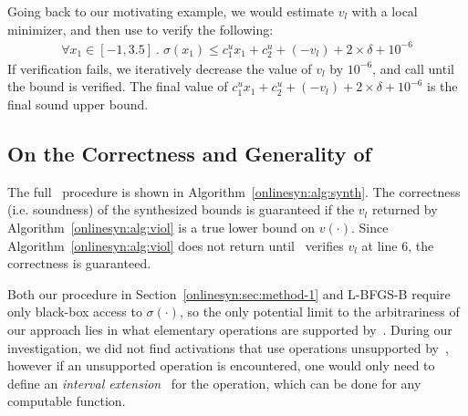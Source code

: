 Going back to our motivating example, we would estimate $ v_l $ with a local
minimizer, and then use \dReal{} to verify the following:
\begin{gather*}
\forall x_1 \in [-1, 3.5] ~. \; \sigma(x_1) \leq c_1^ux_1 + c_2^u + (-v_l) + 2
\times \delta + 10^{-6}
\end{gather*}
If verification fails, we iteratively decrease the value of $ v_l $ by $
10^{-6} $, and call \dReal{} until the bound is verified. The final
value of $ c_1^ux_1 + c_2^u + (-v_l) + 2 \times \delta + 10^{-6} $ is the final
sound upper bound.

\subsection{On the Correctness and Generality of~\Name{}}
The full~\Name{} procedure is shown in Algorithm~\ref{onlinesyn:alg:synth}. The
correctness (i.e. soundness) of the synthesized bounds is guaranteed if the $
v_l $ returned by Algorithm~\ref{onlinesyn:alg:viol} is a true lower bound on $
v(\cdot)
$. Since Algorithm~\ref{onlinesyn:alg:viol} does not return until~\dReal{}
verifies $ v_l
$ at line 6, the correctness is guaranteed.

Both our procedure in Section~\ref{onlinesyn:sec:method-1} and L-BFGS-B require
only
black-box access to $ \sigma(\cdot) $, so the only potential limit to the
arbitrariness of our approach lies in what elementary operations are supported
by~\dReal{}. During our investigation, we did not find activations that use
operations unsupported by~\dReal{}, however if an unsupported operation is
encountered, one would only need to define an \textit{interval
extension}~\cite{moore2009introduction} for the operation, which can be done
for any computable function.

